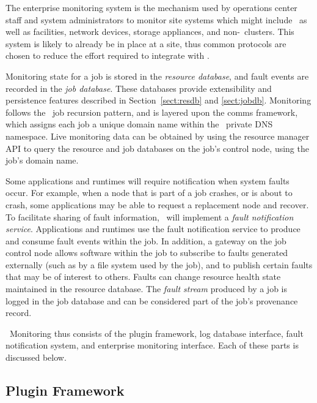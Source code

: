 The enterprise monitoring system is the mechanism used by operations center
staff and system administrators to monitor site systems which might include
\ngrm\ as well as facilities, network devices, storage appliances,
and non-\ngrm\ clusters.
This system is likely to already be in place at a site, thus common
protocols are chosen to reduce the effort required to integrate with \ngrm.

Monitoring state for a job is stored in the {\em resource database}, and
fault events are recorded in the {\em job database}.
These databases provide extensibility and persistence features described
in Section~\ref{sect:resdb} and \ref{sect:jobdb}.
Monitoring follows the \ngrm\ job recursion pattern, and is layered upon
the comms framework, which assigns each job a unique domain name within
the \ngrm\ private DNS namespace.
Live monitoring data can be obtained by using the resource
manager API to query the resource and job databases on the job's control
node, using the job's domain name.

Some applications and runtimes will require notification when system faults
occur.  For example, when a node that is part of a job crashes, or is about to
crash, some applications may be able to request a replacement node and recover.
To facilitate sharing of fault information, \ngrm\ will implement a
{\em fault notification service}.
Applications and runtimes use the fault notification service to produce
and consume fault events within the job.  In addition, a gateway on the
job control node allows software within the job to subscribe to faults
generated externally (such as by a file system used by the job), and to
publish certain faults that may be of interest to others.
Faults can change resource health state maintained in the resource database.
The {\em fault stream} produced by a job is logged in the job database
and can be considered part of the job's provenance record.

\ngrm\ Monitoring thus consists of
the plugin framework, 
log database interface,
fault notification system, and
enterprise monitoring interface.
Each of these parts is discussed below.

\subsection{Plugin Framework}

